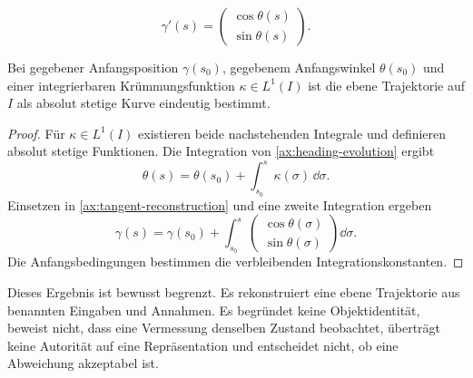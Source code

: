 \begin{axiom}[Tangentenrekonstruktion]
\label{ax:tangent-reconstruction}
\[
\gamma'(s)=
\begin{pmatrix}
\cos\theta(s)\\
\sin\theta(s)
\end{pmatrix}.
\]
\end{axiom}

\begin{proposition}
\label{prop:curvature-driven-reconstruction}
Bei gegebener Anfangsposition \(\gamma(s_0)\), gegebenem Anfangswinkel
\(\theta(s_0)\) und einer integrierbaren Krümmungsfunktion
\(\kappa\in L^1(I)\) ist die ebene Trajektorie auf \(I\) als absolut
stetige Kurve eindeutig bestimmt.
\end{proposition}

\begin{proof}
Für \(\kappa\in L^1(I)\) existieren beide nachstehenden Integrale und
definieren absolut stetige Funktionen. Die Integration von
\cref{ax:heading-evolution} ergibt
\[
\theta(s)=\theta(s_0)+\int_{s_0}^{s}\kappa(\sigma)\,\dd\sigma.
\]
Einsetzen in \cref{ax:tangent-reconstruction} und eine zweite Integration
ergeben
\[
\gamma(s)=\gamma(s_0)+
\int_{s_0}^{s}
\begin{pmatrix}
\cos\theta(\sigma)\\
\sin\theta(\sigma)
\end{pmatrix}
\dd\sigma.
\]
Die Anfangsbedingungen bestimmen die verbleibenden Integrationskonstanten.
\end{proof}

Dieses Ergebnis ist bewusst begrenzt. Es rekonstruiert eine ebene Trajektorie
aus benannten Eingaben und Annahmen. Es begründet keine Objektidentität,
beweist nicht, dass eine Vermessung denselben Zustand beobachtet, überträgt
keine Autorität auf eine Repräsentation und entscheidet nicht, ob eine
Abweichung akzeptabel ist.
